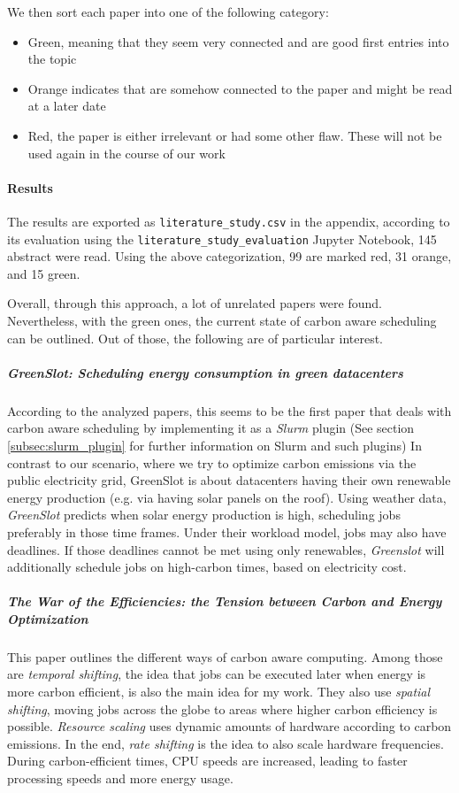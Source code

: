 We then sort each paper into one of the following category:

\begin{itemize}
    \item Green, meaning that they seem very connected and are good first entries into the topic
    \item Orange indicates that are somehow connected to the paper and might be read at a later date
    \item Red, the paper is either irrelevant or had some other flaw. These will not be used again in the course of our work
\end{itemize}

\paragraph{Results}

The results are exported as \verb|literature_study.csv| in the appendix, according to its evaluation using the \verb|literature_study_evaluation| Jupyter Notebook, 145 abstract were read. 
Using the above categorization, 99 are marked red, 31 orange, and 15 green.

Overall, through this approach, a lot of unrelated papers were found.
Nevertheless, with the green ones, the current state of carbon aware scheduling can be outlined.
Out of those, the following are of particular interest.

\subparagraph{GreenSlot: Scheduling energy consumption in green datacenters\cite{inigo_goiri_greenslot_2011}} According to the analyzed papers, this seems to be the first paper that deals with carbon aware scheduling by implementing it as a \emph{Slurm} plugin (See section \ref{subsec:slurm_plugin} for further information on Slurm and such plugins)
In contrast to our scenario, where we try to optimize carbon emissions via the public electricity grid, GreenSlot is about datacenters having their own renewable energy production (e.g. via having solar panels on the roof). 
Using weather data, \emph{GreenSlot} predicts when solar energy production is high, scheduling jobs preferably in those time frames.
Under their workload model, jobs may also have deadlines.
If those deadlines cannot be met using only renewables, \emph{Greenslot} will additionally schedule jobs on high-carbon times, based on electricity cost.

\subparagraph{The War of the Efficiencies: the Tension between Carbon and Energy Optimization}\cite{hanafy_war_2023} This paper outlines the different ways of carbon aware computing. 
Among those are \emph{temporal shifting}, the idea that jobs can be executed later when energy is more carbon efficient, is also the main idea for my work. 
They also use \emph{spatial shifting}, moving jobs across the globe to areas where higher carbon efficiency is possible. 
\emph{Resource scaling} uses dynamic amounts of hardware according to carbon emissions.
In the end, \emph{rate shifting} is the idea to also scale hardware frequencies. During carbon-efficient times, CPU speeds are increased, leading to faster processing speeds and more energy usage.

